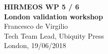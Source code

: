\documentclass[xcolor=svgnames]{beamer}
\begin{document}

    \begin{frame}
        \begin{center}
            \color{RoyalBlue}
            \textbf{
                \Huge{HIRMEOS WP 5 / 6}\\
                \Large{London validation workshop}\\
            }
            \vspace{40pt}
            Francesco de Virgilio\\
            \vspace{8pt}
            \scriptsize{Tech Team Lead, Ubiquity Press}\\
            \scriptsize{London, 19/06/2018}
        \end{center}
    \end{frame}
\end{document}
